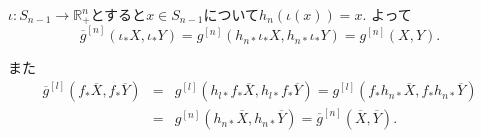 \documentclass{jsarticle}
\newcommand{\RR}{\mathbb{R}}
\theoremstyle{definition}
\numberwithin{theorem}{section}
\begin{document}
$\iota:S_{n-1}\rightarrow \RR^n_+$とすると$x \in S_{n-1}$について$h_n(\iota(x))=x$.
よって
\[
\overline{g}^{[n]}(\iota_* X, \iota_* Y)=g^{[n]}(h_{n*}  \iota_* X, h_{n*} \iota_* Y)=g^{[n]}(X,Y).
\]

また
\begin{eqnarray*}
\overline{g}^{[l]}(f_* \overline{X}, f_* \overline{Y})&=&g^{[l]}(h_{l*} f_* \overline{X}, h_{l*} f_* \overline{Y})=g^{[l]}(f_* h_{n*} \overline{X}, f_* h_{n*} \overline{Y})\\
&=&g^{[n]}(h_{n*} \overline{X}, h_{n*} \overline{Y})=\overline{g}^{[n]}(\overline{X}, \overline{Y}).
\end{eqnarray*}
\end{document}
